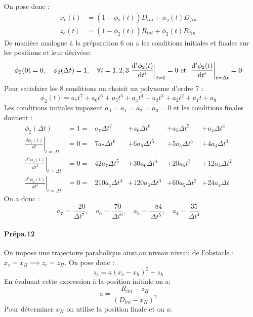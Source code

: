 \documentclass[10pt,a4paper,notitlepage]{article}
\begin{document}
On pose donc :
\begin{equation}
  \begin{aligned}
    x_{c}(t) &=(1-\phi_2(t)) D_{i n i}+\phi_2(t) D_{f i n} \\
    z_{c}(t) &=(1-\phi_2(t)) R_{i n i}+\phi_2(t) R_{f i n}
  \end{aligned}
\end{equation}
De manière analogue à la préparation 6 on a les conditions initiales et finales sur les positions  et leur dérivées:
\[
  \phi_2(0) = 0 ,\quad \phi_2(\Delta t) =1, \quad \forall i = 1,2,3\left. \deriv[^i\phi_2(t)]{t^i}\right|_{t=0}= 0 \text{ et } \left.\deriv[^i\phi_2(t)]{t^i}\right|_{t=\Delta t}= 0
\]
Pour satisfaire les 8 conditions on choisit un polynome d'ordre 7 :
\begin{equation}
  \phi_2(t)=a_{7} t^{7}+a_{6} t^{6}+a_{5} t^{5}+a_{4} t^{4}+a_{3} t^{3}+a_{2} t^{2}+a_{1} t+a_{0}
\end{equation}
Les conditions initiales imposent $a_0=a_1=a_2=a_3 =0$ et les conditions finales donnent :
\begin{equation}
  \begin{array}{llllll}
    \phi_2(\Delta t)                                          & =1 =  & a_7\Delta t^7    & + a_6 \Delta t^6  & + a_5 \Delta t^5 & + a_4 \Delta t^4 \\[1em]
    \left.\frac{d \phi_2(t)}{d t}\right|_{t=\Delta t}         & =0 =  & 7a_7\Delta t^6   & + 6a_6 \Delta t^5 &+ 5a_5\Delta t^4   &+ 4a_4 \Delta t^3  \\[1em]
    \left.\frac{d^{2} \phi_2(t)}{d t^{2}}\right|_{t=\Delta t} & =0 =  & 42a_7\Delta t^5  & +30a_6 \Delta t^4 &+ 20a_5 t^3   &+ 12a_4\Delta t^2  \\[1em]
    \left.\frac{d^{3} \phi_2(t)}{d t^{3}}\right|_{t=\Delta t} & =0  = & 210a_z\Delta t^4 & +120a_6\Delta t^3 &+ 60a_5 \Delta t^2 &+ 24a_4\Delta t 
  \end{array}
\end{equation}
On a donc :
\begin{equation}
  a_{7}=\frac{-20}{\Delta t^{7}}, \quad a_{6}=\frac{70}{\Delta t^{6}}, \quad a_{5}=\frac{-84}{\Delta t^{5}}, \quad a_{4}=\frac{35}{\Delta t^{4}}
\end{equation}

\paragraph{Prépa.12}

On impose une trajectoire parabolique ainsi,au niveau niveau de l'obstacle :$x_c=x_H \implies z_c=z_H$. On pose donc :
\[
  z_c = a(x_c-x_h)^2+z_h
\]
En évaluant cette expression à la position initiale on a:
\[
  a = \frac{R_{ini}-z_H}{(D_{ini}-x_H)^2}
\]
Pour déterminer $x_H$ on utilise la position finale et on a:
\end{document}
